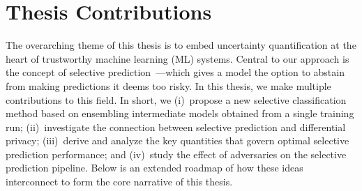 

\vspace{15pt}
\section{Thesis Contributions}
\label{sec:contrib}

The overarching theme of this thesis is to embed uncertainty quantification at the heart of trustworthy machine learning (ML) systems. Central to our approach is the concept of selective prediction~\citep{chow1957optimum,el2010foundations}—which gives a model the option to abstain from making predictions it deems too risky. In this thesis, we make multiple contributions to this field. In short, we (i)~propose a new selective classification method based on ensembling intermediate models obtained from a single training run; (ii)~investigate the connection between selective prediction and differential privacy; (iii)~derive and analyze the key quantities that govern optimal selective prediction performance; and (iv)~study the effect of adversaries on the selective prediction pipeline. Below is an extended roadmap of how these ideas interconnect to form the core narrative of this thesis.

